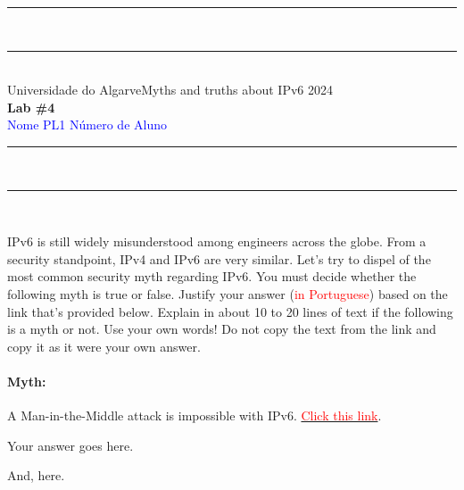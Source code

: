 \documentclass{article}
\begin{document}
\begin{center}
\rule{\textwidth}{.0075in} \\
\rule[3mm]{\textwidth}{.0075in}\\

Universidade do Algarve\hfill Myths and truths about IPv6 \hfill 2024\\[3ex]

{\Large\bf Lab \#4} \\[3ex]

 \textcolor{blue}{Nome} \hfill  
 \textcolor{blue}{PL1} \hfill
 \textcolor{blue}{Número de Aluno}\\

\rule{\textwidth}{.0075in} \\
\rule[3mm]{\textwidth}{.0075in} \\
\end{center}

\bigskip

\noindent
IPv6 is still widely misunderstood among engineers across the
globe. From a security standpoint, IPv4 and IPv6 are very
similar. Let's try to dispel of the most common security myth
regarding IPv6. You must decide whether the following myth is true or
false. Justify your answer (\textcolor{red}{in Portuguese}) based on
the link that's provided below. Explain in about 10 to 20 lines of
text if the following is a myth or not. Use your own words! Do not
copy the text from the link and copy it as it were your own answer.

\noindent
\paragraph{Myth:} A Man-in-the-Middle attack is impossible with IPv6.
\href{https://www.eweek.com/security/attackers-can-use-ipv6-to-launch-man-in-the-middle-attacks}{\textcolor{red}{Click
    this link}}.\\

\bigskip

\noindent

{\LARGE
\noindent
Your answer goes here. \\

\medskip

\noindent
And, here.
}
\end{document}
